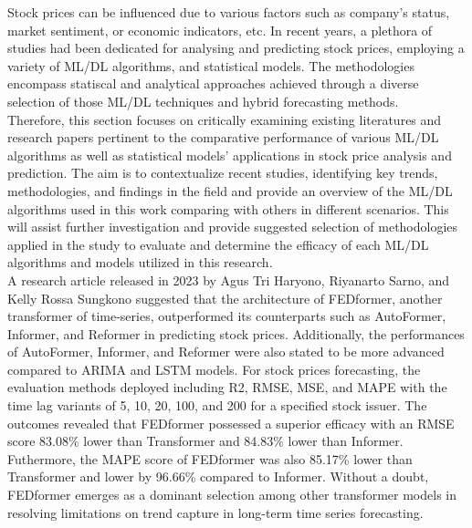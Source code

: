 \documentclass{ieeeojies}
\begin{document}
Stock prices can be influenced due to various factors such as company’s status, market sentiment, or economic indicators, etc. In recent years, a plethora of studies had been dedicated for analysing and predicting stock prices, employing a variety of ML/DL algorithms, and statistical models. The methodologies encompass statiscal and analytical approaches achieved through a diverse selection of those ML/DL techniques and hybrid forecasting methods.\\ 
Therefore, this section focuses on critically examining existing literatures and research papers pertinent to the comparative performance of various ML/DL algorithms as well as statistical models’ applications in stock price analysis and prediction. The aim is to contextualize recent studies, identifying key trends, methodologies, and findings in the field and provide an overview of the ML/DL algorithms used in this work comparing with others in different scenarios. This will assist further investigation and provide suggested selection of methodologies applied in the study to evaluate and determine the efficacy of each ML/DL algorithms and models utilized in this research.\\
A research article released in 2023 by Agus Tri Haryono, Riyanarto Sarno, and Kelly Rossa Sungkono suggested that the architecture of FEDformer, another transformer of time-series, outperformed its counterparts such as AutoFormer, Informer, and Reformer in predicting stock prices. Additionally, the performances of AutoFormer, Informer, and Reformer were also stated to be more advanced compared to ARIMA and LSTM models. For stock prices forecasting, the evaluation methods deployed including R2, RMSE, MSE, and MAPE with the time lag variants of 5, 10, 20, 100, and 200 for a specified stock issuer. The outcomes revealed that FEDformer possessed a superior efficacy with an RMSE score 83.08\% lower than Transformer and 84.83\% lower than Informer. Futhermore, the MAPE score of FEDformer was also 85.17\% lower than Transformer and lower by 96.66\% compared to Informer. Without a doubt, FEDformer emerges as a dominant selection among other transformer models in resolving limitations on trend capture in long-term time series forecasting.
\end{document}
